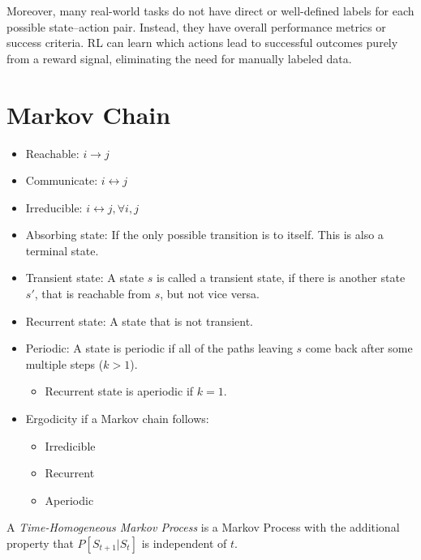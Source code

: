 Moreover, many real-world tasks do not have direct or well-defined labels for each possible state–action pair. Instead, they have overall performance metrics or success criteria. RL can learn which actions lead to successful outcomes purely from a reward signal, eliminating the need for manually labeled data. 


\section{Markov Chain}
\begin{itemize}
	\item Reachable: $i\to j$
	\item Communicate: $i\leftrightarrow j$
	\item Irreducible: $i\leftrightarrow j, \forall i,j$
	\item Absorbing state: If the only possible transition is to itself. This is also a terminal state.
	\item Transient state: A state $s$ is called a transient state, if there is another state $s'$, that is reachable from $s$, but not vice versa. 
	\item Recurrent state: A state that is not transient. 
	\item Periodic: A state is periodic if all of the paths leaving $s$ come back after some multiple steps ($k>1$). 
		\begin{itemize}
			\item Recurrent state is aperiodic if $k=1$.
		\end{itemize}
	\item Ergodicity if a Markov chain follows:
		\begin{itemize}
			\item Irredicible
			\item Recurrent
			\item Aperiodic
		\end{itemize}
\end{itemize}


A \textit{Time-Homogeneous Markov Process} is a Markov Process with the additional property that $P[S_{t+1}|S_t]$ is independent of $t$.
